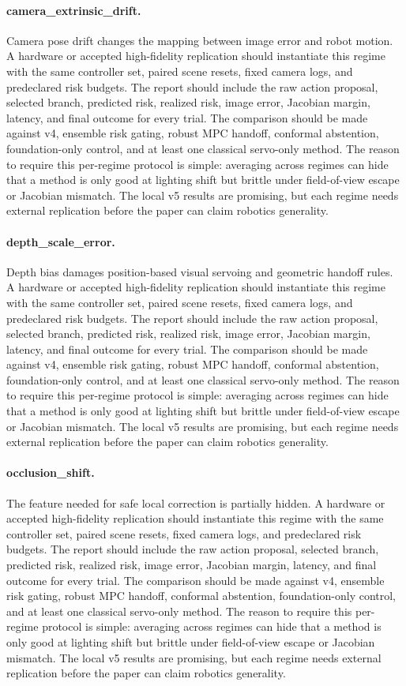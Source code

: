 \documentclass{article}
\begin{document}
\paragraph{camera\_extrinsic\_drift.} Camera pose drift changes the mapping between image error and robot motion.
A hardware or accepted high-fidelity replication should instantiate this regime with the same controller set, paired scene resets, fixed camera logs, and predeclared risk budgets. The report should include the raw action proposal, selected branch, predicted risk, realized risk, image error, Jacobian margin, latency, and final outcome for every trial. The comparison should be made against v4, ensemble risk gating, robust MPC handoff, conformal abstention, foundation-only control, and at least one classical servo-only method.
The reason to require this per-regime protocol is simple: averaging across regimes can hide that a method is only good at lighting shift but brittle under field-of-view escape or Jacobian mismatch. The local v5 results are promising, but each regime needs external replication before the paper can claim robotics generality.
\paragraph{depth\_scale\_error.} Depth bias damages position-based visual servoing and geometric handoff rules.
A hardware or accepted high-fidelity replication should instantiate this regime with the same controller set, paired scene resets, fixed camera logs, and predeclared risk budgets. The report should include the raw action proposal, selected branch, predicted risk, realized risk, image error, Jacobian margin, latency, and final outcome for every trial. The comparison should be made against v4, ensemble risk gating, robust MPC handoff, conformal abstention, foundation-only control, and at least one classical servo-only method.
The reason to require this per-regime protocol is simple: averaging across regimes can hide that a method is only good at lighting shift but brittle under field-of-view escape or Jacobian mismatch. The local v5 results are promising, but each regime needs external replication before the paper can claim robotics generality.
\paragraph{occlusion\_shift.} The feature needed for safe local correction is partially hidden.
A hardware or accepted high-fidelity replication should instantiate this regime with the same controller set, paired scene resets, fixed camera logs, and predeclared risk budgets. The report should include the raw action proposal, selected branch, predicted risk, realized risk, image error, Jacobian margin, latency, and final outcome for every trial. The comparison should be made against v4, ensemble risk gating, robust MPC handoff, conformal abstention, foundation-only control, and at least one classical servo-only method.
The reason to require this per-regime protocol is simple: averaging across regimes can hide that a method is only good at lighting shift but brittle under field-of-view escape or Jacobian mismatch. The local v5 results are promising, but each regime needs external replication before the paper can claim robotics generality.
\end{document}
